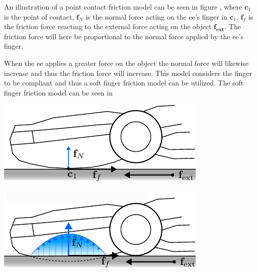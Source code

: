 An illustration of a point contact friction model can be seen in figure , where $\mathbf{c}_1$ is the point of contact, $\mathbf{f}_N$ is the normal force acting on the \gls{ee}'s finger in $\mathbf{c}_1$, $\mathbf{f}_f$ is the friction force reacting to the external force acting on the object $\mathbf{f_{\text{ext}}}$. The friction force will here be proportional to the normal force applied by the \gls{ee}'s finger.\medskip

When the \gls{ee} applies a greater force on the object the normal force will likewise increase and thus the friction force will increase. This model considers the finger to be compliant and thus a soft finger friction model can be utilized. The soft finger friction model can be seen in 

\begin{center}
    \renewcommand{\arraystretch}{1.2}
    \begin{minipage}{.48\linewidth}
        \vspace{0pt}
        \centering
        \includegraphics[width=.95\textwidth]{chapters/modeling/fig/friction-single-point.pdf}
    \end{minipage}%
    \hfill%
    \begin{minipage}{.48\linewidth}
        \vspace{0pt}
        \centering
        \includegraphics[width=.95\textwidth]{chapters/modeling/fig/friction-surface.pdf}
    \end{minipage}%

\end{center}
